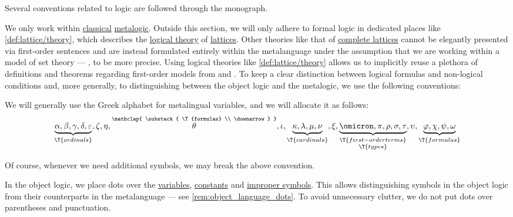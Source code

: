 \begin{remark}\label{rem:mathematical_logic_conventions}
  Several conventions related to logic are followed through the monograph.

  We only work within \hyperref[con:classical_logic]{classical} \hyperref[con:metalogic]{metalogic}. Outside this section, we will only adhere to formal logic in dedicated places like \cref{def:lattice/theory}, which describes the \hyperref[def:logical_theory]{logical theory} of \hyperref[def:lattice]{lattices}. Other theories like that of \hyperref[def:complete_lattice]{complete lattices} cannot be elegantly presented via first-order sentences and are instead formulated entirely within the metalanguage under the assumption that we are working within a model of set theory --- \hyperref[def:axiom_of_universes]{}, to be more precise. Using logical theories like \cref{def:lattice/theory} allows us to implicitly reuse a plethora of definitions and theorems regarding first-order models from  and . To keep a clear distinction between logical formulas and non-logical conditions and, more generally, to distinguishing between the object logic and the metalogic, we use the following conventions:

  \begin{thmenum}
     We will generally use the Greek alphabet for metalingual variables, and we will allocate it as follows:
    \begin{equation*}
      \underbrace{\alpha, \beta, \gamma, \delta, \varepsilon}_{\T{ordinals}},
      \zeta, \eta,
      \overset{ \mathclap{ \substack{ \T{formulas} \\ \downarrow } } }{\theta},
      \iota,
      \underbrace{\kappa, \lambda, \mu, \nu}_{\T{cardinals}},
      \xi,
      \underbrace{\omicron, \pi, \rho, \sigma, \tau}_{\substack{\T{first-order terms} \\ \T{types}}},
      \upsilon,
      \underbrace{\varphi, \chi, \psi, \omega}_{\T{formulas}}
    \end{equation*}

    Of course, whenever we need additional symbols, we may break the above convention.

     In the object logic, we place dots over the \hyperref[con:variable]{variables}, \hyperref[con:variable]{constants} and \hyperref[con:improper_symbol]{improper symbols}. This allows distinguishing symbols in the object logic from their counterparts in the metalanguage --- see \cref{rem:object_language_dots}. To avoid unnecessary clutter, we do not put dots over parentheses and punctuation.


\end{thmenum}
\end{remark}
